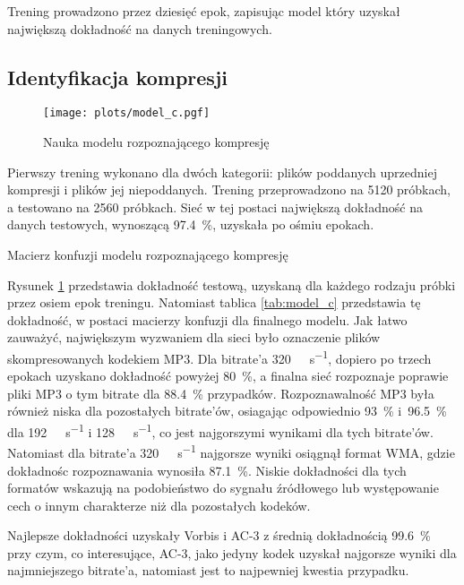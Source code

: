\documentclass[pl,12pt]{aghdpl}
\let\Oldsubsection\subsection%
\renewcommand{\subsection}{\FloatBarrier\Oldsubsection}
\begin{document}
Trening prowadzono przez dziesięć epok, zapisując model który uzyskał największą
dokładność na danych treningowych.

\subsection{Identyfikacja kompresji}
\begin{figure}[!tbh]
  \centering
  \texttt{[image: plots/model\_c.pgf]}
  \caption{Nauka modelu rozpoznającego kompresję}
  \label{fig:model_c}
\end{figure}
Pierwszy trening wykonano dla dwóch kategorii: plików poddanych uprzedniej
kompresji i plików jej niepoddanych. Trening przeprowadzono na 5120 próbkach, a
testowano na 2560 próbkach. Sieć w tej postaci największą dokładność na danych
testowych, wynoszącą \SI{97.4}{\percent}, uzyskała po ośmiu epokach.

\begin{table}[!tbh]
  \centering
  \caption{Macierz konfuzji modelu rozpoznającego kompresję}
  
  \label{tab:model_c}
\end{table}

Rysunek \ref{fig:model_c} przedstawia dokładność testową, uzyskaną dla każdego
rodzaju próbki przez osiem epok treningu. Natomiast tablica \ref{tab:model_c}
przedstawia tę dokładność, w postaci macierzy konfuzji dla finalnego modelu. Jak łatwo
zauważyć, największym wyzwaniem dla sieci było oznaczenie plików skompresowanych
kodekiem MP3. Dla bitrate'a \SI{320}{\kibi\bit\per\second}, dopiero po trzech
epokach uzyskano dokładność powyżej \SI{80}{\percent}, a finalna sieć
rozpoznaje poprawie pliki MP3 o tym bitrate dla \SI{88.4}{\percent} przypadków.
Rozpoznawalność MP3 była również niska dla pozostałych bitrate'ów, osiagając
odpowiednio \SI{93}{\percent} i~\SI{96.5}{\percent} dla
\SI{192}{\kibi\bit\per\second} i \SI{128}{\kibi\bit\per\second}, co jest
najgorszymi wynikami dla tych bitrate'ów. Natomiast dla bitrate'a
\SI{320}{\kibi\bit\per\second} najgorsze wyniki osiągnął format WMA, gdzie
dokładnośc rozpoznawania wynosiła \SI{87.1}{\percent}. Niskie dokładności dla
tych formatów wskazują na podobieństwo do sygnału źródłowego lub występowanie
cech o innym charakterze niż dla pozostałych kodeków.

Najlepsze dokładności uzyskały Vorbis i AC-3 z średnią dokładnością
\SI{99.6}{\percent} przy czym, co interesujące, AC-3, jako jedyny kodek uzyskał
najgorsze wyniki dla najmniejszego bitrate'a, natomiast jest to najpewniej
kwestia przypadku.
\end{document}
